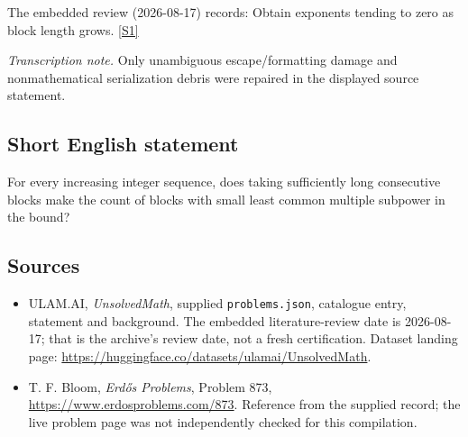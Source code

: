 \documentclass[11pt,a4paper]{article}
\newcommand{\sref}[2]{\hyperlink{source:#1:#2}{[S#2]}}
\begin{document}
The embedded review (2026-08-17) records: Obtain exponents tending to zero as block length grows. \sref{statement}{1}

{\small\emph{Transcription note.} Only unambiguous escape/formatting damage and nonmathematical serialization debris were repaired in the displayed source statement.}

\subsection{Short English statement}

For every increasing integer sequence, does taking sufficiently long consecutive blocks make the count of blocks with small least common multiple subpower in the bound?

\subsection{Sources}

{\small

\begin{itemize}

\item[\hypertarget{source:statement:1}{S1}] ULAM.AI, \emph{UnsolvedMath}, supplied \texttt{problems.json}, catalogue entry, statement and background. The embedded literature-review date is 2026-08-17; that is the archive’s review date, not a fresh certification. Dataset landing page: \url{https://huggingface.co/datasets/ulamai/UnsolvedMath}.

\item[\hypertarget{source:statement:2}{S2}] T. F. Bloom, \emph{Erdős Problems}, Problem 873, \url{https://www.erdosproblems.com/873}. Reference from the supplied record; the live problem page was not independently checked for this compilation.

\end{itemize}

}

\label{end:statement}
\end{document}
